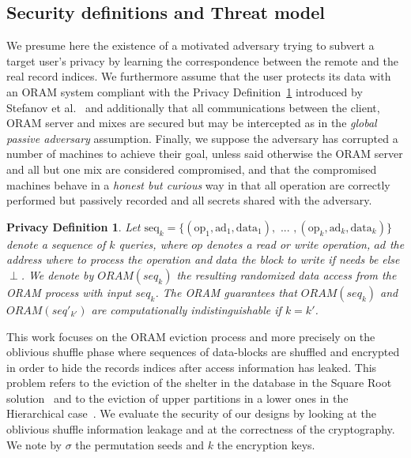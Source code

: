 \documentclass{llncs}
\newtheorem{privdef}{Privacy Definition}
\begin{document}
\subsection{Security definitions and Threat model}\label{Threat}

We presume here the existence of a motivated adversary trying to subvert a target user's privacy by learning the correspondence between the remote and the real record indices. We furthermore assume that the user protects its data with an ORAM system compliant with the Privacy Definition~\ref{def:Oram} introduced by Stefanov et al.~\cite{stefanov2011towards} and additionally that all communications between the client, ORAM server and mixes are secured but may be intercepted as in the \textit{global passive adversary} assumption.
Finally, we suppose the adversary has corrupted a number of machines to achieve their goal, unless said otherwise the ORAM server and all but one mix are considered compromised, and that the compromised machines behave in a \textit{honest but curious} way in that all operation are correctly performed but passively recorded and all secrets shared with the adversary.

\begin{privdef}\label{def:Oram}
Let $\text{seq}_k=\{(\text{op}_1, \text{ad}_1, \text{data}_1), \text{ ... },(\text{op}_k, \text{ad}_k, \text{data}_k)\}$ denote a sequence of $k$ queries, where $op$ denotes a read or write operation, $ad$ the address where to process the operation and $data$ the block to write if needs be else $\perp$.
We denote by $ORAM(seq_k)$ the resulting randomized data access from the ORAM process with input $seq_k$.
The ORAM guarantees that $ORAM(seq_k)$ and $ORAM(seq'_{k'})$ are computationally indistinguishable if $k=k'$.
\end{privdef}

This work focuses on the ORAM eviction process and more precisely on the oblivious shuffle phase where sequences of data-blocks are shuffled and encrypted in order to hide the records indices after access information has leaked. This problem refers to the eviction of the shelter in the database in the Square Root solution~\cite{ostrovsky1990efficient} and to the eviction of upper partitions in a lower ones in the Hierarchical case~\cite{goldreich1996software}. We evaluate the security of our designs by looking at the oblivious shuffle information leakage and at the correctness of the cryptography. We note by $\sigma$ the permutation seeds and $k$ the encryption keys.\\
\end{document}
